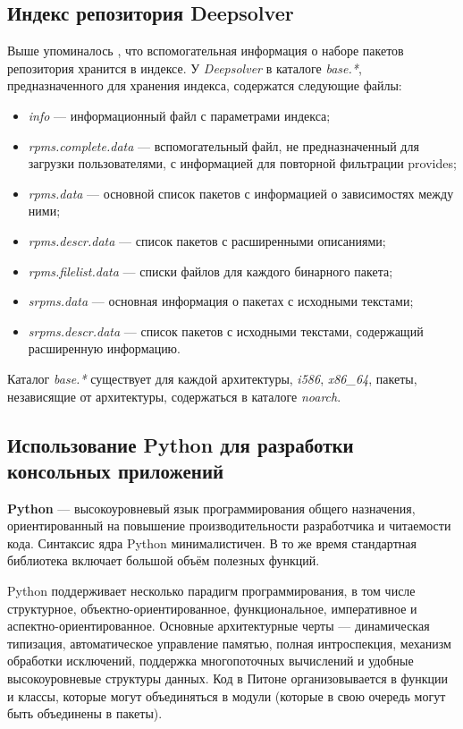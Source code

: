 \subsection{Индекс репозитория Deepsolver}
Выше упоминалось , что вспомогательная информация о наборе пакетов репозитория
хранится в индексе. У \textit{Deepsolver} в каталоге \textit{base.*}, предназначенного для хранения индекса,
содержатся следующие файлы:\\
\begin{itemize}
\item{\textit{info} --- информационный файл с параметрами индекса;} 
\item{\textit{rpms.complete.data} --- вспомогательный файл, не предназначенный
для загрузки пользователями, с информацией для повторной фильтрации
provides;}
\item{\textit{rpms.data} --- основной список пакетов с информацией о зависимостях между ними;}
\item{\textit{rpms.descr.data} --- список пакетов с расширенными описаниями;}
\item{\textit{rpms.filelist.data} --- списки файлов для каждого бинарного пакета;}
\item{\textit{srpms.data} --- основная информация о пакетах с исходными текстами;}
\item{\textit{srpms.descr.data} --- список пакетов с исходными текстами, содержащий
расширенную информацию.}
\end{itemize} 
Каталог  \textit{base.*} существует для каждой архитектуры, \textit{i586}, \textit{x86\_64}, пакеты,
независящие от архитектуры, содержаться в каталоге \textit{noarch}.\\

\subsection{Использование Python для разработки консольных приложений}
\textbf{Python} --- высокоуровневый язык программирования общего назначения, ориентированный на повышение производительности разработчика и читаемости кода. Синтаксис ядра Python минималистичен. В то же время стандартная библиотека включает большой объём полезных функций\cite{wiki_python}.

Python поддерживает несколько парадигм программирования, в том числе структурное, объектно-ориентированное, 
функциональное, императивное и аспектно-ориентированное. Основные архитектурные черты --- динамическая типизация, 
автоматическое управление памятью, полная интроспекция, механизм обработки исключений, поддержка многопоточных вычислений 
и удобные высокоуровневые структуры данных. 
Код в Питоне организовывается в функции и классы, которые могут объединяться в модули (которые в свою очередь могут быть объединены в пакеты).

